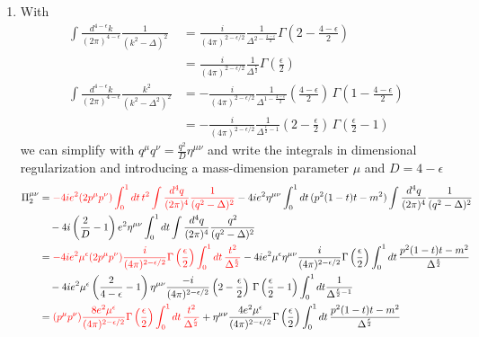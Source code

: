\documentclass[10pt,a4paper]{article}
\theoremstyle{definition}
\begin{document}
\begin{enumerate}[1.]
\begin{enumerate}[1.)]
\begin{itemize}
\end{itemize}

\item With
\begin{align}
\int\frac{d^{4-\epsilon}k}{(2\pi)^{4-\epsilon}}\frac{1}{(k^2-\Delta)^2}
&=\frac{i}{(4\pi)^{{2-\epsilon}/2}}\frac{1}{\Delta^{2-\frac{{4-\epsilon}}{2}}}\Gamma\left(2-\frac{{4-\epsilon}}{2}\right)\\
&=\frac{i}{(4\pi)^{{2-\epsilon}/2}}\frac{1}{\Delta^{\frac{\epsilon}{2}}}\Gamma\left(\frac{\epsilon}{2}\right)\\
\int\frac{d^{4-\epsilon}k}{(2\pi)^{4-\epsilon}}\frac{k^{2}}{(k^2-\Delta^2)^2}
&=-\frac{i}{(4\pi)^{{2-\epsilon}/2}}\frac{1}{\Delta^{1-\frac{{4-\epsilon}}{2}}}\left(\frac{{4-\epsilon}}{2}\right)\,\Gamma\left(1-\frac{{4-\epsilon}}{2}\right)\\
&=-\frac{i}{(4\pi)^{{2-\epsilon}/2}}\frac{1}{\Delta^{\frac{\epsilon}{2}-1}}\left(2-\frac{\epsilon}{2}\right)\,\Gamma\left(\frac{\epsilon}{2}-1\right)
\end{align}
we can simplify with $q^\mu q^\nu=\frac{q^2}{D}\eta^{\mu\nu}$ and write the integrals in dimensional regularization and introducing a mass-dimension parameter $\mu$ and $D=4-\epsilon$
\begin{align}
\Pi_2^{\mu\nu}
&=\textcolor{red}{-4ie^2(2p^\mu p^\nu)\int_0^1 dt\, t^2\int\frac{d^4q}{(2\pi)^4} \frac{1}{(q^2-\Delta)^2}}
-4ie^2\eta^{\mu\nu}\int_0^1 dt\,(p^2(1-t)t-m^2)\int\frac{d^4q}{(2\pi)^4} \frac{1}{(q^2-\Delta)^2}\\
&\quad-4i\left(\frac{2}{D}-1\right)e^2\eta^{\mu\nu}\int_0^1 dt\int\frac{d^4q}{(2\pi)^4}\frac{q^2}{(q^2-\Delta)^2}\\
%
&=\textcolor{red}{-4ie^2\mu^\epsilon(2p^\mu p^\nu)\frac{i}{(4\pi)^{{2-\epsilon}/2}}\Gamma\left(\frac{\epsilon}{2}\right)\int_0^1 dt\,\frac{t^2}{\Delta^{\frac{\epsilon}{2}}}}
-4ie^2\mu^\epsilon\eta^{\mu\nu}\frac{i}{(4\pi)^{{2-\epsilon}/2}}\Gamma\left(\frac{\epsilon}{2}\right)\int_0^1 dt\,\frac{p^2(1-t)t-m^2}{\Delta^{\frac{\epsilon}{2}}}\\
&\quad-4ie^2\mu^\epsilon\left(\frac{2}{4-\epsilon}-1\right)\eta^{\mu\nu}\frac{-i}{(4\pi)^{{2-\epsilon}/2}}\left(2-\frac{\epsilon}{2}\right)\,\Gamma\left(\frac{\epsilon}{2}-1\right)\int_0^1 dt \frac{1}{\Delta^{\frac{\epsilon}{2}-1}}\\
&=\textcolor{red}{(p^\mu p^\nu)\frac{8e^2\mu^\epsilon}{(4\pi)^{{2-\epsilon}/2}}\Gamma\left(\frac{\epsilon}{2}\right)\int_0^1 dt\,\frac{t^2}{\Delta^{\frac{\epsilon}{2}}}}
+\eta^{\mu\nu}\frac{4e^2\mu^\epsilon}{(4\pi)^{{2-\epsilon}/2}}\Gamma\left(\frac{\epsilon}{2}\right)\int_0^1 dt\,\frac{p^2(1-t)t-m^2}{\Delta^{\frac{\epsilon}{2}}}\\

\end{align}
\end{enumerate}
\end{enumerate}
\end{document}

